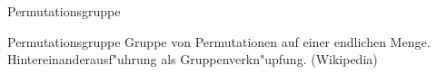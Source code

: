 \documentclass[class=article, crop=false]{standalone}
\begin{document}
\begin{zettel}{Permutationsgruppe}
\begin{flashcard}[x3u1y1nz]{Permutationsgruppe}
	Gruppe von Permutationen auf einer endlichen Menge. Hintereinanderausf"uhrung als Gruppenverkn"upfung. (Wikipedia)
\end{flashcard}
\end{zettel}
\end{document}
